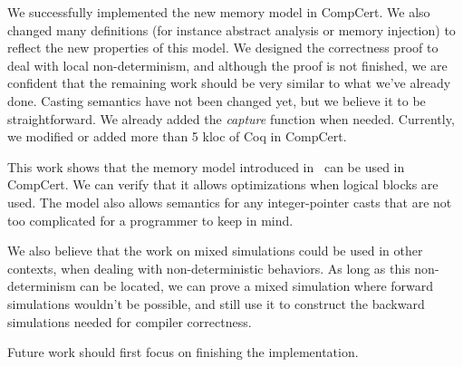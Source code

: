 \label{sec:conclusion}

We successfully implemented the new memory model in CompCert. We also changed many definitions (for instance abstract analysis or memory injection) to reflect the new properties of this model. We designed the correctness proof to deal with local non-determinism, and although the proof is not finished, we are confident that the remaining work should be very similar to what we've already done.
Casting semantics have not been changed yet, but we believe it to be straightforward. We already added the \textit{capture} function when needed.
Currently, we modified or added more than 5 kloc of Coq in CompCert.

This work shows that the memory model introduced in~\cite{DBLP:conf/pldi/KangHMGZV15} can be used in CompCert. We can verify that it allows optimizations when logical blocks are used. The model also allows semantics for any integer-pointer casts that are not too complicated for a programmer to keep in mind.

We also believe that the work on mixed simulations could be used in other contexts, when dealing with non-deterministic behaviors. As long as this non-determinism can be located, we can prove a mixed simulation where forward simulations wouldn't be possible, and still use it to construct the backward simulations needed for compiler correctness.

Future work should first focus on finishing the implementation.
